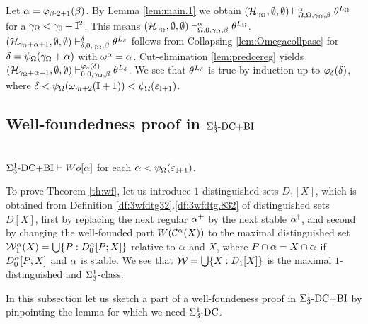 \documentclass{article}
\newcommand{\mI}{\mathbb{I}}
\begin{document}
Let 
$\alpha=\varphi_{\beta\cdot 2+1}(\beta)$.
By Lemma \ref{lem:main.1} we obtain
$(\mathcal{H}_{\gamma_{\Omega}},\emptyset,\emptyset)
\vdash_{\Omega,\Omega,\gamma_{\Omega},\beta}^{\alpha}
\theta^{L_{\Omega}}$ for a $\gam_{\Ome}<\gam_{0}+\mI^{2}$.
This means
$(\mathcal{H}_{\gamma_{\Omega}},\emptyset,\emptyset)
\vdash_{\Omega,0,\gamma_{\Omega},\beta}^{\alpha}
\theta^{L_{\Omega}}$.
$(\mathcal{H}_{\gamma_{\Omega}+\alpha+1},\emptyset,\emptyset)
\vdash_{\delta,0,\gamma_{\Omega},\beta}^{\delta}\theta^{L_{\delta}}$ follows from Collapsing \ref{lem:Omegacollpase} 
for
$\delta=\psi_{\Omega}(\gamma_{\Omega}+\alpha)$ with $\omega^{\alpha}=\alpha$.
Cut-elimination \ref{lem:predcereg} yields 
$(\mathcal{H}_{\gamma_{\Omega}+\alpha+1},\emptyset,\emptyset)
\vdash_{0,0,\gamma_{\Omega},\beta}^{\varphi_{\delta}(\delta)}\theta^{L_{\delta}}$.
We see that $\theta^{L_{\delta}}$ is true by induction up to $\varphi_{\delta}(\delta)$,
where $\del<\psi_{\Ome}(\ome_{m+2}(\mI+1))<\psi_{\Ome}(\veps_{\mI+1})$.


\subsection{Well-foundedness proof in $\Sigma^{1}_{3}\mbox{{\rm -DC+BI}}$}

\begin{theorem}\label{th:wf}{\rm \cite{pi1collection}}\\
$\Sigma^{1}_{3}\mbox{{\rm -DC+BI}}\vdash Wo[\alpha]$
for {\rm each} $\alp<\psi_{\Ome}(\veps_{\mI+1})$.
\end{theorem}

To prove Theorem \ref{th:wf}, let us introduce $1$-distinguished sets $D_{1}[X]$, which is obtained from
Definition \ref{df:3wfdtg32}.\ref{df:3wfdtg.832} of distinguished sets $D[X]$,
first by replacing the next regular $\alpha^{+}$ by the next stable $\alpha^{\dagger}$, and
second by changing the well-founded part $W({\cal C}^{\alpha}(X))$ to the maximal
distinguished set ${\cal W}_{1}^{\alpha}(X)=\bigcup\{P: D_{0}^{\alpha}[P;X]\}$ relative to $\alpha$ and $X$,
where $P\cap\alpha=X\cap\alpha$ if $D_{0}^{\alpha}[P;X]$ and $\alpha$ is stable.
We see that ${\cal W}=\bigcup\{X: D_{1}[X]\}$ is the maximal $1$-distinguished and $\Sigma^{1}_{3}$-class.

In this subsection let us sketch a part of a well-foundeness proof in $\Sigma^{1}_{3}\mbox{{\rm -DC+BI}}$
by pinpointing the lemma for which we need $\Sigma^{1}_{3}\mbox{{\rm -DC}}$.
\\
\end{document}
